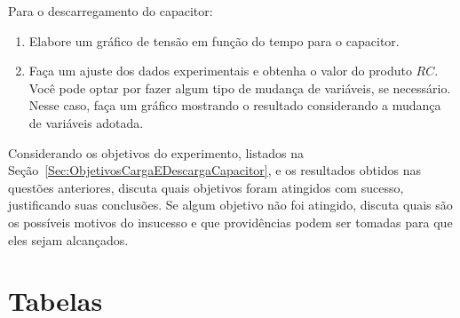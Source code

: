 \begin{question}[type={exam}]{3}
Para o descarregamento do capacitor:
    \begin{enumerate}[label=\roman*.]
        \item Elabore um gráfico de tensão em função do tempo para o capacitor.
        \item Faça um ajuste dos dados experimentais e obtenha o valor do produto $RC$. Você pode optar por fazer algum tipo de mudança de variáveis, se necessário. Nesse caso, faça um gráfico mostrando o resultado considerando a mudança de variáveis adotada.
    \end{enumerate}
\end{question}

\begin{question}[type={exam}]{2}
Considerando os objetivos do experimento, listados na Seção~\ref{Sec:ObjetivosCargaEDescargaCapacitor}, e os resultados obtidos nas questões anteriores, discuta quais objetivos foram atingidos com sucesso, justificando suas conclusões. Se algum objetivo não foi atingido, discuta quais são os possíveis motivos do insucesso e que providências podem ser tomadas para que eles sejam alcançados.
\end{question}

\vfill
\pagebreak
\section{Tabelas}

